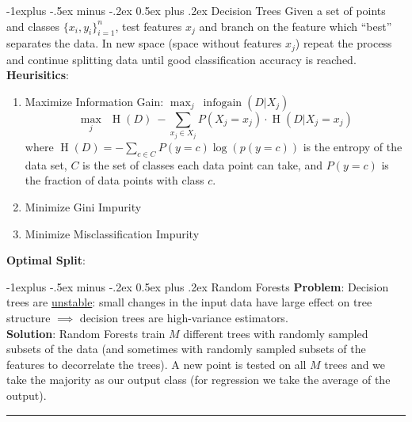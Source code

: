 \documentclass[3pt,landscape]{article}
\makeatletter
\renewcommand{\subsection}{\@startsection{subsection}{2}{0mm}%
                            {-1explus -.5ex minus -.2ex}%
                            {0.5ex plus .2ex}%
                            {\normalfont\normalsize\bfseries}}
\makeatother
\begin{document}
\begin{multicols}{3}
\newpage
\subsection{Decision Trees}
Given a set of points and classes $\{x_i,y_i\}_{i=1}^n$, test features $x_j$ and branch on the feature which ``best'' separates the data. In new space (space without features $x_j$) repeat the process and continue splitting data until good classification accuracy is reached.
{\bf Heurisitics}:
\begin{enumerate}

\item Maximize Information Gain: \(\max_j \ \operatorname{infogain}(D|X_j)\) \[ \max_j \ \ \operatorname{H}(D) \ - \sum_{x_j \in X_j} P(X_j = x_j) \cdot \operatorname{H}(D | X_j = x_j) \]
where $\operatorname{H}(D) = -\sum_{c \in C} P(y = c) \log(p(y = c)) $ is the entropy of the data set, $C$ is the set of classes each data point can take, and $P(y=c)$ is the fraction of data points with class $c$.

\item Minimize Gini Impurity

\item Minimize Misclassification Impurity

\end{enumerate}

{\bf Optimal Split}:

\subsection{Random Forests}
{\bf Problem}: Decision trees are \underline{unstable}: small changes in the input data have large effect on tree structure $\implies$ decision trees are high-variance estimators.\\
{\bf Solution}: Random Forests train $M$ different trees with randomly sampled subsets of the data (and sometimes with randomly sampled subsets of the features to decorrelate the trees). A new point is tested on all $M$ trees and we take the majority as our output class (for regression we take the average of the output).

\newpage


\rule{0.3\linewidth}{0.25pt}
\scriptsize


\end{multicols}
\end{document}
